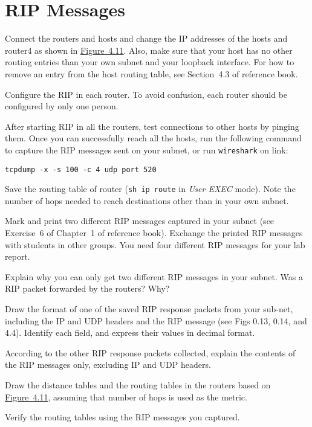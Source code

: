 \documentclass{../UTNetLab}
\begin{document}
\section{RIP Messages}
    Connect the routers and hosts and change the IP addresses of the hosts and router4 as shown in \hyperref[fig:4.11]{Figure~4.11}.
    Also, make sure that your host has no other routing entries than your own subnet and your loopback interface.
    For how to remove an entry from the host routing table, see Section~4.3 of reference book.

    Configure the RIP in each router.
    To avoid confusion, each router should be configured by only one person.

    After starting RIP in all the routers, test connections to other hosts by pinging them.
    Once you can successfully reach all the hosts, run the following command to capture the RIP messages sent on your subnet, or run \lstinline{wireshark} on link:
    \begin{lstlisting}
tcpdump -x -s 100 -c 4 udp port 520
    \end{lstlisting}

    Save the routing table of router (\lstinline{sh ip route} in \textit{User EXEC} mode).
    Note the number of hops needed to reach destinations other than in your own subnet.

    Mark and print two different RIP messages captured in your subnet (see Exercise~6 of Chapter~1 of reference book).
    Exchange the printed RIP messages with students in other groups.
    You need four different RIP messages for your lab report.
    
    \begin{report}
    \item Explain why you can only get two different RIP messages in your subnet.
    Was a RIP packet forwarded by the routers?
    Why?
    
    \item Draw the format of one of the saved RIP response packets from your sub-net, including the IP and UDP headers and the RIP message (see Figs 0.13, 0.14, and 4.4).
    Identify each field, and express their values in decimal format.
    
    \item According to the other RIP response packets collected, explain the contents of the RIP messages only, excluding IP and UDP headers.

    
    \item Draw the distance tables and the routing tables in the routers based on \hyperref[fig:4.11]{Figure~4.11}, assuming that number of hops is used as the metric.

    \item Verify the routing tables using the RIP messages you captured.
    \end{report}
\end{document}

